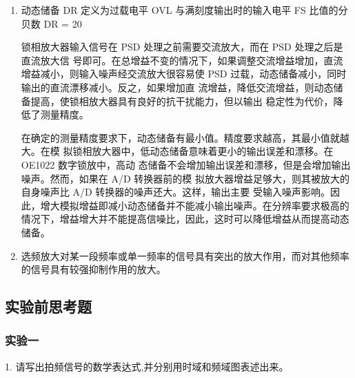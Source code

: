 \documentclass[11pt,a4paper]{ctexart}
\begin{document}
\begin{enumerate}
 \item 动态储备 DR 定义为过载电平 OVL 与满刻度输出时的输入电平 FS 比值的分贝数
 \beq
 DR = 20   
\eeq
\par
锁相放大器输入信号在 PSD 处理之前需要交流放大，而在 PSD 处理之后是直流放大信
号即可。在总增益不变的情况下，如果调整交流增益增加，直流增益减小，则输入噪声经交流放大很容易使 PSD 过载，动态储备减小，同时输出的直流漂移减小。反之，如果增加直
流增益，降低交流增益，则动态储备提高，使锁相放大器具有良好的抗干扰能力，但以输出
稳定性为代价，降低了测量精度。\par
在确定的测量精度要求下，动态储备有最小值。精度要求越高，其最小值就越大。在模
拟锁相放大器中，低动态储备意味着更小的输出误差和漂移。在 OE1022 数字锁放中，高动
态储备不会增加输出误差和漂移，但是会增加输出噪声。然而，如果在 A/D 转换器前的模
拟放大器增益足够大，则其被放大的自身噪声比 A/D 转换器的噪声还大。这样，输出主要
受输入噪声影响。因此，增大模拟增益即减小动态储备并不能减小输出噪声。在分辨率要求极高的情况下，增益增大并不能提高信噪比，因此，这时可以降低增益从而提高动态储备。
\item 
 选频放大对某一段频率或单一频率的信号具有突出的放大作用，而对其他频率的信号具有较强抑制作用的放大。
 \end{enumerate}
\subsection{实验前思考题}
\subsubsection{实验一}
1. 请写出拍频信号的数学表达式,并分别用时域和频域图表述出来。
\end{document}
